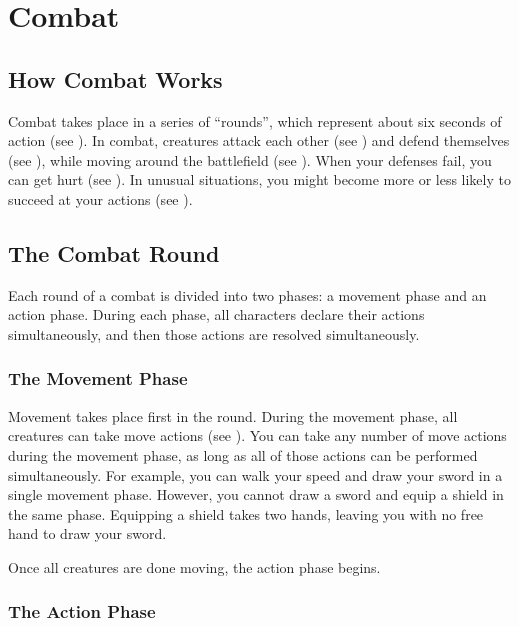 \chapter{Combat}\label{Combat}

\section{How Combat Works}
Combat takes place in a series of ``rounds'', which represent about six seconds of action (see ). In combat, creatures attack each other (see ) and defend themselves (see ), while moving around the battlefield (see ). When your defenses fail, you can get hurt (see ). In unusual situations, you might become more or less likely to succeed at your actions (see ).

\section{The Combat Round}\label{The Combat Round}

Each round of a combat is divided into two phases: a movement phase and an action phase. During each phase, all characters declare their actions simultaneously, and then those actions are resolved simultaneously.

\subsection{The Movement Phase}\label{The Movement Phase}

Movement takes place first in the round. During the movement phase, all creatures can take move actions (see ). You can take any number of move actions during the movement phase, as long as all of those actions can be performed simultaneously. For example, you can walk your speed and draw your sword in a single movement phase. However, you cannot draw a sword and equip a shield in the same phase. Equipping a shield takes two hands, leaving you with no free hand to draw your sword.

Once all creatures are done moving, the action phase begins.

\subsection{The Action Phase}\label{The Action Phase}

